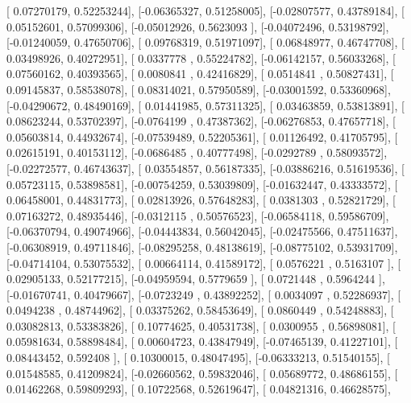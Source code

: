 \documentclass{article}
\begin{document}
       [ 0.07270179,  0.52253244],
       [-0.06365327,  0.51258005],
       [-0.02807577,  0.43789184],
       [ 0.05152601,  0.57099306],
       [-0.05012926,  0.5623093 ],
       [-0.04072496,  0.53198792],
       [-0.01240059,  0.47650706],
       [ 0.09768319,  0.51971097],
       [ 0.06848977,  0.46747708],
       [ 0.03498926,  0.40272951],
       [ 0.0337778 ,  0.55224782],
       [-0.06142157,  0.56033268],
       [ 0.07560162,  0.40393565],
       [ 0.0080841 ,  0.42416829],
       [ 0.0514841 ,  0.50827431],
       [ 0.09145837,  0.58538078],
       [ 0.08314021,  0.57950589],
       [-0.03001592,  0.53360968],
       [-0.04290672,  0.48490169],
       [ 0.01441985,  0.57311325],
       [ 0.03463859,  0.53813891],
       [ 0.08623244,  0.53702397],
       [-0.0764199 ,  0.47387362],
       [-0.06276853,  0.47657718],
       [ 0.05603814,  0.44932674],
       [-0.07539489,  0.52205361],
       [ 0.01126492,  0.41705795],
       [ 0.02615191,  0.40153112],
       [-0.0686485 ,  0.40777498],
       [-0.0292789 ,  0.58093572],
       [-0.02272577,  0.46743637],
       [ 0.03554857,  0.56187335],
       [-0.03886216,  0.51619536],
       [ 0.05723115,  0.53898581],
       [-0.00754259,  0.53039809],
       [-0.01632447,  0.43333572],
       [ 0.06458001,  0.44831773],
       [ 0.02813926,  0.57648283],
       [ 0.0381303 ,  0.52821729],
       [ 0.07163272,  0.48935446],
       [-0.0312115 ,  0.50576523],
       [-0.06584118,  0.59586709],
       [-0.06370794,  0.49074966],
       [-0.04443834,  0.56042045],
       [-0.02475566,  0.47511637],
       [-0.06308919,  0.49711846],
       [-0.08295258,  0.48138619],
       [-0.08775102,  0.53931709],
       [-0.04714104,  0.53075532],
       [ 0.00664114,  0.41589172],
       [ 0.0576221 ,  0.5163107 ],
       [ 0.02905133,  0.52177215],
       [-0.04959594,  0.5779659 ],
       [ 0.0721448 ,  0.5964244 ],
       [-0.01670741,  0.40479667],
       [-0.0723249 ,  0.43892252],
       [ 0.0034097 ,  0.52286937],
       [ 0.0494238 ,  0.48744962],
       [ 0.03375262,  0.58453649],
       [ 0.0860449 ,  0.54248883],
       [ 0.03082813,  0.53383826],
       [ 0.10774625,  0.40531738],
       [ 0.0300955 ,  0.56898081],
       [ 0.05981634,  0.58898484],
       [ 0.00604723,  0.43847949],
       [-0.07465139,  0.41227101],
       [ 0.08443452,  0.592408  ],
       [ 0.10300015,  0.48047495],
       [-0.06333213,  0.51540155],
       [ 0.01548585,  0.41209824],
       [-0.02660562,  0.59832046],
       [ 0.05689772,  0.48686155],
       [ 0.01462268,  0.59809293],
       [ 0.10722568,  0.52619647],
       [ 0.04821316,  0.46628575],
\end{document}
